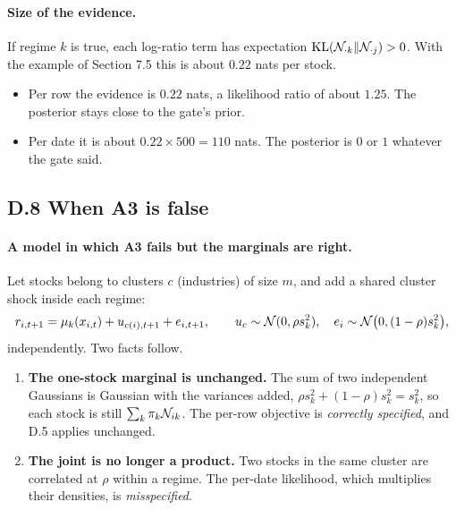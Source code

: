 \paragraph{Size of the evidence.} If regime $k$ is true, each log-ratio term has expectation $\mathrm{KL}(\mathcal{N}_{\cdot k}\|\mathcal{N}_{\cdot j})>0$. With the example of Section 7.5 this is about $0.22$ nats per stock.
\begin{itemize}
  \item Per row the evidence is $0.22$ nats, a likelihood ratio of about $1.25$. The posterior stays close to the gate's prior.
  \item Per date it is about $0.22\times500=110$ nats. The posterior is $0$ or $1$ whatever the gate said.
\end{itemize}

\subsection*{D.8 When A3 is false}

\paragraph{A model in which A3 fails but the marginals are right.} Let stocks belong to clusters $c$ (industries) of size $m$, and add a shared cluster shock inside each regime:
\begin{equation*}
r_{i,t+1}=\mu_k(x_{i,t})+u_{c(i),t+1}+e_{i,t+1},\qquad u_c\sim\mathcal{N}(0,\rho s_k^2),\quad e_i\sim\mathcal{N}\big(0,(1-\rho)s_k^2\big),
\end{equation*}
independently. Two facts follow.
\begin{enumerate}
  \item \textbf{The one-stock marginal is unchanged.} The sum of two independent Gaussians is Gaussian with the variances added, $\rho s_k^2+(1-\rho)s_k^2=s_k^2$, so each stock is still $\sum_k\pi_k\mathcal{N}_{ik}$. The per-row objective is \emph{correctly specified}, and D.5 applies unchanged.
  \item \textbf{The joint is no longer a product.} Two stocks in the same cluster are correlated at $\rho$ within a regime. The per-date likelihood, which multiplies their densities, is \emph{misspecified}.
\end{enumerate}

